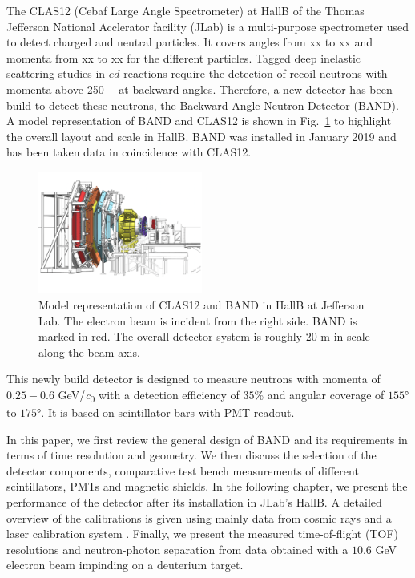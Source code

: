 \documentclass[3p,final,twocolumn]{elsarticle}
\begin{document}
The CLAS12 (Cebaf Large Angle Spectrometer) \cite{Burkert:2020akg} at HallB of the Thomas Jefferson National Acclerator facility (JLab) is a multi-purpose spectrometer used to detect charged and neutral particles. It covers angles from xx to xx and momenta from xx to xx for the different particles. 
Tagged deep inelastic scattering studies in $ed$ reactions require the detection of recoil neutrons with momenta above \SI{250}{\mega\eVperc} at backward angles. Therefore, a new detector has been build to detect these neutrons, the Backward Angle Neutron Detector (BAND). A model representation of BAND and CLAS12 is shown in Fig.~\ref{fig:clas12band} to highlight the overall layout and scale in HallB. BAND was installed in January 2019 and has been taken data in coincidence with CLAS12.

\begin{figure}[t!]
	\centering
	\includegraphics[width=0.48\textwidth]{BandInClas.pdf}
		\caption{Model representation of CLAS12 and BAND in HallB at Jefferson Lab. The electron beam is incident from the right side. BAND is marked in red. The overall detector system is roughly 20 \si{\meter} in scale along the beam axis. }
		\label{fig:clas12band}
\end{figure}

This newly build detector is designed to measure neutrons with momenta of $0.25 - 0.6$ \si{\GeV/\clight} with a detection efficiency of $35$\%  and angular coverage of $155$\si{\degree} to $175$\si{\degree}. It is based on scintillator bars with PMT readout. 

In this paper, we first review the general design of BAND and its requirements in terms of time resolution  and geometry. We then discuss the selection of the detector components,
comparative test bench measurements of different scintillators, PMTs and magnetic shields. In the following chapter, we present the performance of the detector after its installation in JLab's HallB. A detailed overview of the calibrations is given using mainly data from cosmic rays and a laser calibration system \cite{band-laser}. Finally, we present the measured time-of-flight (TOF) resolutions and neutron-photon separation from  data obtained with a $10.6$ \si{\GeV} electron beam impinding on a deuterium target.
\end{document}
